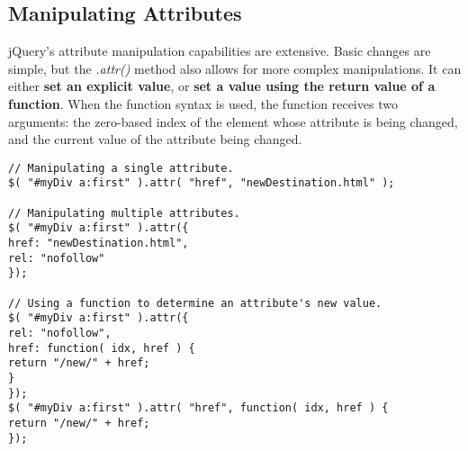 \documentclass[10pt,letterpaper]{book}
\begin{document}
\subsection{Manipulating Attributes}
jQuery's attribute manipulation capabilities are extensive. Basic changes are simple, but the \textit{.attr()} method also allows for more complex manipulations. It can either \textbf{set an explicit value}, or \textbf{set a value using the return value of a function}. When the function syntax is used, the function receives two arguments: the zero-based index of the element whose attribute is being changed, and the current value of the attribute being changed.
\begin{lstlisting}
// Manipulating a single attribute.
$( "#myDiv a:first" ).attr( "href", "newDestination.html" );

// Manipulating multiple attributes.
$( "#myDiv a:first" ).attr({
href: "newDestination.html",
rel: "nofollow"
});

// Using a function to determine an attribute's new value.
$( "#myDiv a:first" ).attr({
rel: "nofollow",
href: function( idx, href ) {
return "/new/" + href;
}
});
$( "#myDiv a:first" ).attr( "href", function( idx, href ) {
return "/new/" + href;
});
\end{lstlisting}
\end{document}

